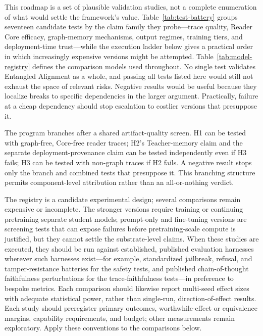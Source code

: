 This roadmap is a set of plausible validation studies, not a complete
enumeration of what would settle the framework's value. Table~\ref{tab:test-battery}
groups seventeen candidate tests by the claim family they probe---trace quality,
Reader Core efficacy, graph-memory mechanisms, output regimes, training tiers,
and deployment-time trust---while the execution ladder below gives a practical
order in which increasingly expensive versions might be attempted.
Table~\ref{tab:model-registry} defines the comparison models used throughout.
No single test validates Entangled Alignment as a whole, and passing all tests
listed here would still not exhaust the space of relevant risks. Negative
results would be useful because they localize breaks to specific dependencies
in the larger argument. Practically, failure at a cheap dependency should stop
escalation to costlier versions that presuppose it.

The program branches after a shared artifact-quality screen. H1 can be tested
with graph-free, Core-free reader traces; H2's Teacher-memory claim and the separate
deployment-provenance claim can be tested independently even if H3 fails; H3 can be tested with non-graph
traces if H2 fails. A negative result stops only the branch and combined tests
that presuppose it. This branching structure permits component-level attribution
rather than an all-or-nothing verdict.

The registry is a candidate experimental design; several comparisons remain
expensive or incomplete. The stronger versions require training or
continuing pretraining separate student models; prompt-only and fine-tuning
versions are screening tests that can expose failures before pretraining-scale
compute is justified, but they cannot settle the substrate-level claims.
When these studies are executed, they should be run against established,
published evaluation harnesses wherever such harnesses exist---for example,
standardized jailbreak, refusal, and tamper-resistance batteries for the safety
tests, and published chain-of-thought faithfulness perturbations for the
trace-faithfulness tests---in preference to bespoke metrics. Each comparison
should likewise report multi-seed effect sizes with adequate statistical power,
rather than single-run, direction-of-effect results. Each study should preregister primary outcomes, worthwhile-effect or
equivalence margins, capability requirements, and budget; other measurements
remain exploratory. Apply these conventions to the comparisons below.

